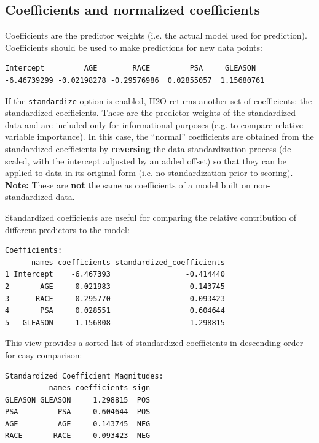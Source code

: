 \subsection{Coefficients and normalized coefficients}

Coefficients are the predictor weights (i.e. the actual model used for prediction).  Coefficients should be used to
make predictions for new data points:


\begin{lstlisting}[style=output]
  Intercept         AGE        RACE         PSA     GLEASON 
-6.46739299 -0.02198278 -0.29576986  0.02855057  1.15680761 
\end{lstlisting}

If the \texttt{standardize} option is enabled, H2O returns another set of coefficients: the standardized
coefficients. These are the predictor weights of the standardized data and are included only for informational
purposes (e.g. to compare relative variable importance). In this case, the ``normal'' coefficients are obtained
from the standardized coefficients by \textbf{reversing} the data standardization process (de-scaled, with the
intercept adjusted by an added offset) so that they can be applied to data in its original form (i.e. no
standardization prior to scoring). \textbf{Note:} These are \textbf{not} the same as coefficients of a model built
on non-standardized data.

Standardized coefficients are useful for comparing the relative contribution of different predictors to the
model:


\begin{lstlisting}[style=output]
Coefficients:
      names coefficients standardized_coefficients
1 Intercept    -6.467393                 -0.414440
2       AGE    -0.021983                 -0.143745
3      RACE    -0.295770                 -0.093423
4       PSA     0.028551                  0.604644
5   GLEASON     1.156808                  1.298815
\end{lstlisting}

This view provides a sorted list of standardized coefficients in descending order for easy comparison:


\begin{lstlisting}[style=output]
Standardized Coefficient Magnitudes:
          names coefficients sign
GLEASON GLEASON     1.298815  POS
PSA         PSA     0.604644  POS
AGE         AGE     0.143745  NEG
RACE       RACE     0.093423  NEG
\end{lstlisting}

